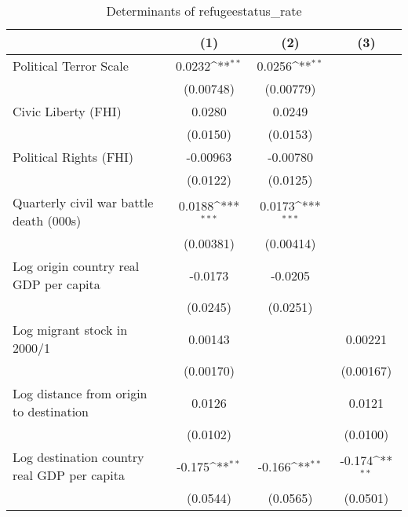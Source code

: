 \begin{table}[htbp]\centering
\def\sym#1{\ifmmode^{#1}\else\(^{#1}\)\fi}
\caption{Determinants of refugeestatus\_rate}
\begin{tabular}{l*{3}{c}}
\hline\hline
                    &\multicolumn{1}{c}{(1)}         &\multicolumn{1}{c}{(2)}         &\multicolumn{1}{c}{(3)}         \\
\hline
Political Terror Scale&      0.0232\sym{**} &      0.0256\sym{**} &                     \\
                    &   (0.00748)         &   (0.00779)         &                     \\
[1em]
Civic Liberty (FHI) &      0.0280         &      0.0249         &                     \\
                    &    (0.0150)         &    (0.0153)         &                     \\
[1em]
Political Rights (FHI)&    -0.00963         &    -0.00780         &                     \\
                    &    (0.0122)         &    (0.0125)         &                     \\
[1em]
Quarterly civil war battle death (000s)&      0.0188\sym{***}&      0.0173\sym{***}&                     \\
                    &   (0.00381)         &   (0.00414)         &                     \\
[1em]
Log origin country real GDP per capita&     -0.0173         &     -0.0205         &                     \\
                    &    (0.0245)         &    (0.0251)         &                     \\
[1em]
Log migrant stock in 2000/1&     0.00143         &                     &     0.00221         \\
                    &   (0.00170)         &                     &   (0.00167)         \\
[1em]
Log distance from origin to destination&      0.0126         &                     &      0.0121         \\
                    &    (0.0102)         &                     &    (0.0100)         \\
[1em]
Log destination country real GDP per capita&      -0.175\sym{**} &      -0.166\sym{**} &      -0.174\sym{**} \\
                    &    (0.0544)         &    (0.0565)         &    (0.0501)         \\

\end{tabular}
\end{table}
